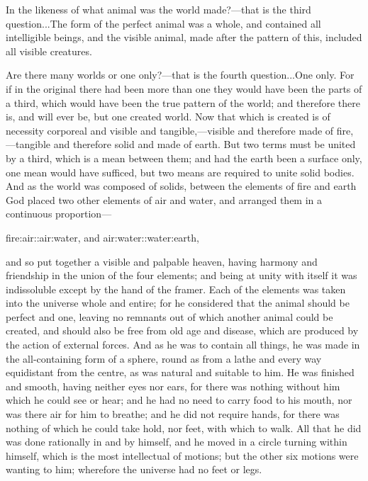 In the likeness of what animal was the world made?—that is the third
question...The form of the perfect animal was a whole, and contained all
intelligible beings, and the visible animal, made after the pattern of
this, included all visible creatures.

Are there many worlds or one only?—that is the fourth question...One
only. For if in the original there had been more than one they would have
been the parts of a third, which would have been the true pattern of the
world; and therefore there is, and will ever be, but one created world.
Now that which is created is of necessity corporeal and visible and
tangible,—visible and therefore made of fire,—tangible and
therefore solid and made of earth. But two terms must be united by a
third, which is a mean between them; and had the earth been a surface
only, one mean would have sufficed, but two means are required to unite
solid bodies. And as the world was composed of solids, between the
elements of fire and earth God placed two other elements of air and water,
and arranged them in a continuous proportion—

fire:air::air:water, and air:water::water:earth,

and so put together a visible and palpable heaven, having harmony and
friendship in the union of the four elements; and being at unity with
itself it was indissoluble except by the hand of the framer. Each of the
elements was taken into the universe whole and entire; for he considered
that the animal should be perfect and one, leaving no remnants out of
which another animal could be created, and should also be free from old
age and disease, which are produced by the action of external forces. And
as he was to contain all things, he was made in the all-containing form of
a sphere, round as from a lathe and every way equidistant from the centre,
as was natural and suitable to him. He was finished and smooth, having
neither eyes nor ears, for there was nothing without him which he could
see or hear; and he had no need to carry food to his mouth, nor was there
air for him to breathe; and he did not require hands, for there was
nothing of which he could take hold, nor feet, with which to walk. All
that he did was done rationally in and by himself, and he moved in a
circle turning within himself, which is the most intellectual of motions;
but the other six motions were wanting to him; wherefore the universe had
no feet or legs.

